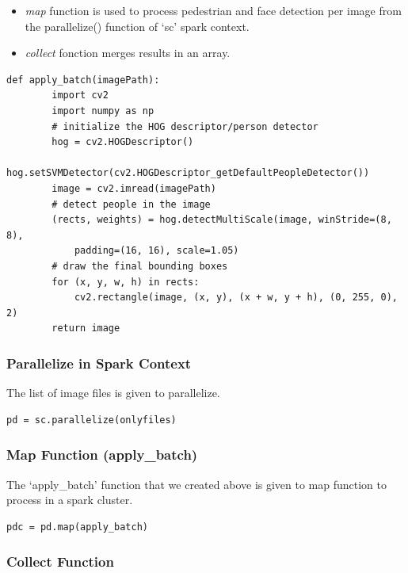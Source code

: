 \begin{itemize}
\tightlist
\item
  \emph{map} function is used to process pedestrian and face detection
  per image from the parallelize() function of `sc' spark context.
\item
  \emph{collect} fonction merges results in an array.
\end{itemize}

\begin{verbatim}
def apply_batch(imagePath):
        import cv2
        import numpy as np
        # initialize the HOG descriptor/person detector
        hog = cv2.HOGDescriptor()
        hog.setSVMDetector(cv2.HOGDescriptor_getDefaultPeopleDetector())
        image = cv2.imread(imagePath)
        # detect people in the image
        (rects, weights) = hog.detectMultiScale(image, winStride=(8, 8),
            padding=(16, 16), scale=1.05)
        # draw the final bounding boxes
        for (x, y, w, h) in rects:
            cv2.rectangle(image, (x, y), (x + w, y + h), (0, 255, 0), 2)
        return image
\end{verbatim}

\subsubsection{Parallelize in Spark
Context}\label{parallelize-in-spark-context}

The list of image files is given to parallelize.

\begin{verbatim}
pd = sc.parallelize(onlyfiles)
\end{verbatim}

\subsubsection{Map Function
(apply\_batch)}\label{map-function-apply_batch}

The `apply\_batch' function that we created above is given to map
function to process in a spark cluster.

\begin{verbatim}
pdc = pd.map(apply_batch)
\end{verbatim}

\subsubsection{Collect Function}\label{collect-function}

